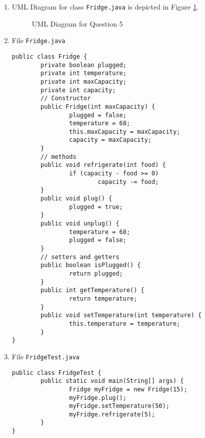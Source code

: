 \begin{enumerate}[label=(\alph*)]

\item UML Diagram for class \texttt{Fridge.java} is depicted in Figure \ref{fig2}.
	\begin{figure}[H]
	\centering
	\caption{UML Diagram for Question 5}\label{fig2}
	\end{figure}

\item File \texttt{Fridge.java}
\lstset{language=java, tabsize=2}
\begin{lstlisting}
public class Fridge {
		private boolean plugged;
		private int temperature;
		private int maxCapacity;
		private int capacity;
		// Constructor
		public Fridge(int maxCapacity) {
				plugged = false;
				temperature = 68;
				this.maxCapacity = maxCapacity;
				capacity = maxCapacity;
		}
		// methods
		public void refrigerate(int food) {
				if (capacity - food >= 0)
						capacity -= food;
		}
		public void plug() {
				plugged = true;
		}
		public void unplug() {
				temperature = 68;
				plugged = false;
		}
		// setters and getters
		public boolean isPlugged() {
				return plugged;
		}
		public int getTemperature() {
				return temperature;
		}
		public void setTemperature(int temperature) {
				this.temperature = temperature;
		}
}
\end{lstlisting}

\item File \texttt{FridgeTest.java}
\lstset{language=java, tabsize=2}
\begin{lstlisting}
public class FridgeTest {
		public static void main(String[] args) {
				Fridge myFridge = new Fridge(15);
				myFridge.plug();
				myFridge.setTemperature(50);
				myFridge.refrigerate(5);
		}
}
\end{lstlisting}
\end{enumerate}

